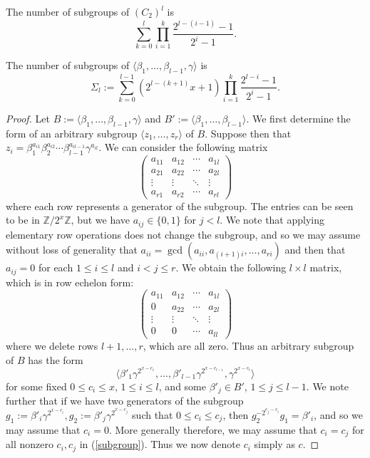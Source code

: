 \documentclass[10pt,a4paper]{amsart}
\begin{document}
\begin{corollary}\label{c_2_subgroups}
    The number of subgroups of $(C_2)^l$ is
    \[\sum_{k=0}^l\prod_{i=1}^k\frac{2^{l-(i-1)}-1}{2^i-1}.\]
\end{corollary}

\begin{proposition}\label{2-subgroups}
The number of subgroups of $\langle \beta_1,\ldots,\beta_{l-1},\gamma\rangle$ is
\[\Sigma_l:=\sum_{k=0}^{l-1}(2^{l-(k+1)}x+1)\prod_{i=1}^k\frac{2^{l-i}-1}{2^i-1}.\]
\end{proposition}

\begin{proof}
    Let $B:=\langle \beta_1,\ldots,\beta_{l-1},\gamma\rangle$ and $B':=\langle \beta_1,\ldots,\beta_{l-1}\rangle$. We first determine the form of an arbitrary subgroup $\langle z_1,\ldots, z_r \rangle$ of $B$. Suppose then that $z_i=\beta_1^{a_{i1}}\beta_2^{a_{i2}}\cdots\beta_{l-1}^{a_{il-1}}\gamma^{a_{il}}$. We can consider the following matrix
    \[\begin{pmatrix}
        a_{11} & a_{12} & \cdots & a_{1l}\\
        a_{21} & a_{22} & \cdots & a_{2l}\\
        \vdots & \vdots & \ddots & \vdots\\
        a_{r1} & a_{r2} & \cdots & a_{rl}
    \end{pmatrix}\]
    where each row represents a generator of the subgroup. The entries can be seen to be in $\mathbb{Z}/2^x\mathbb{Z}$, but we have $a_{ij} \in \{0,1\}$ for $j<l$. We note that applying elementary row operations does not change the subgroup, and so we may assume without loss of generality that $a_{ii}=\gcd(a_{ii},a_{(i+1)i},\ldots,a_{ri})$ and then that $a_{ij}=0$ for each $1 \leq i \leq l$ and $i<j \leq r$. We obtain the following $l \times l$ matrix, which is in row echelon form:
    \[\begin{pmatrix}
        a_{11} & a_{12} & \cdots & a_{1l}\\
        0 & a_{22} & \cdots & a_{2l}\\
        \vdots & \vdots & \ddots & \vdots\\
        0 & 0 & \cdots & a_{ll}
    \end{pmatrix}\]
    where we delete rows $l+1,\ldots,r$, which are all zero. Thus an arbitrary subgroup of $B$ has the form
\begin{equation}\label{subgroup}
    \langle \beta'_1\gamma^{2^{x-c_1}},\ldots,\beta'_{l-1}\gamma^{2^{x-c_{l-1}}},\gamma^{2^{x-c_l}}\rangle
\end{equation}
    for some fixed $0 \leq c_i \leq x$, $1\leq i \leq l$, and some $\beta'_j \in B'$, $1 \leq j \leq l-1$. We note further that if we have two generators of the subgroup $g_1:=\beta'_i\gamma^{2^{x-c_i}}, g_2:=\beta'_j\gamma^{2^{x-c_j}}$ such that $0 \leq c_i \leq c_j$, then $g_2^{-2^{c_j-c_i}}g_1=\beta'_i$, and so we may assume that $c_i=0$. More generally therefore, we may assume that $c_i=c_j$ for all nonzero $c_i,c_j$ in (\ref{subgroup}). Thus we now denote $c_i$ simply as $c$.
 

\end{proof}
\end{document}
